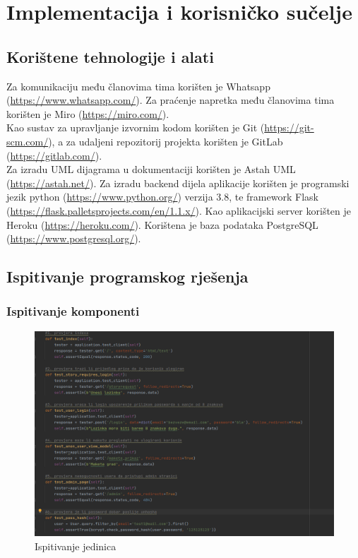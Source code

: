 \chapter{Implementacija i korisničko sučelje}
		
		
		\section{Korištene tehnologije i alati}
			 Za komunikaciju među članovima tima korišten je Whatsapp (\href{https://www.whatsapp.com/}{https://www.whatsapp.com/}). Za praćenje napretka među članovima tima korišten je Miro (\href{https://miro.com/}{https://miro.com/}).\\
			 Kao sustav za upravljanje izvornim kodom korišten je Git (\href{https://git-scm.com/}{https://git-scm.com/}), a za udaljeni repozitorij projekta korišten je GitLab (\href{https://gitlab.com/}{https://gitlab.com/}).\\
			 Za izradu UML dijagrama u dokumentaciji korišten je Astah UML (\href{https://astah.net/}{https://astah.net/}).
			 Za izradu backend dijela aplikacije korišten je programski jezik python (\href{https://www.python.org/}{https://www.python.org/}) verzija 3.8, te framework Flask (\href{https://flask.palletsprojects.com/en/1.1.x/}{https://flask.palletsprojects.com/en/1.1.x/}). Kao aplikacijski server korišten je Heroku (\href{https://heroku.com/}{https://heroku.com/}). Korištena je baza podataka PostgreSQL (\href{https://www.postgresql.org/}{https://www.postgresql.org/}).
			\eject 
		
	
		\section{Ispitivanje programskog rješenja}
			\subsection{Ispitivanje komponenti}
			
			\begin{figure}[H]
				\includegraphics[width=1\linewidth]{slike/unit_tests.PNG} %
				\caption{Ispitivanje jedinica}
				\label{fig:unit1} %
			\end{figure}
		
